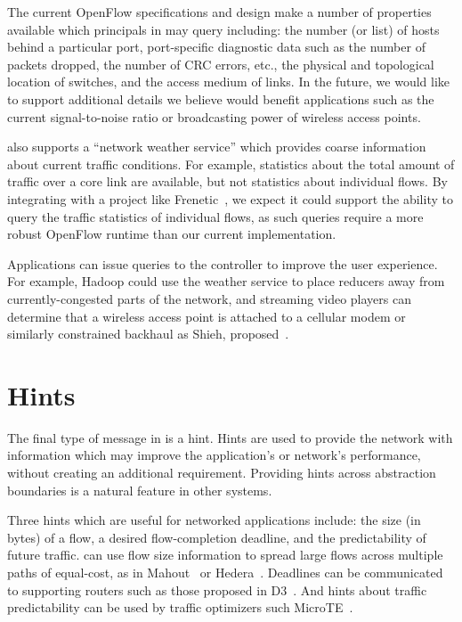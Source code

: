 The current OpenFlow specifications and design make a number of
properties available which principals in \sys may query including:
 the number (or list) of hosts behind a particular
port, port-specific diagnostic data such as the number of packets
dropped, the number of CRC errors, etc., the physical and topological
location of switches, and the access medium of links. In the future,
we would like to support additional details we believe would
benefit applications such as the current signal-to-noise ratio or
broadcasting power of wireless access points.

\sys also supports a ``network weather service'' which provides coarse
information about current traffic conditions. For example, statistics
about the total amount of traffic over a core link are available, but
not statistics about individual flows. By integrating \sys with a
project like Frenetic~\cite{Foster:2010}, we expect it could support
the ability to query the traffic statistics of individual flows, as
such queries require a more robust OpenFlow runtime than our current
implementation.

Applications can issue queries to the \sys controller to improve the
user experience. For example, Hadoop could use the weather service to
place reducers away from currently-congested parts of the network, and
streaming video players can determine that a wireless access point is
attached to a cellular modem or similarly constrained backhaul as
Shieh, \etal proposed~\cite{Shieh11netquery}.

\section{Hints}
\label{sec:Hints}

The final type of message in \sys is a hint. Hints are used to provide
the network with information which may improve the application's or
network's performance, without creating an additional
requirement. Providing hints across abstraction boundaries is a
natural feature in other systems.

Three hints which are useful for networked applications include: the
size (in bytes) of a flow, a desired flow-completion deadline, and the
predictability of future traffic. \sys can use flow size information
to spread large flows across multiple paths of equal-cost, as in Mahout~\cite{curtis11mahout} or
Hedera~\cite{alfares10hedera}.  Deadlines
can be communicated to supporting routers such as those proposed in
D3~\cite{wilson11d3}. And hints about traffic predictability can be
used by traffic optimizers such MicroTE~\cite{Benson2011microte}.

